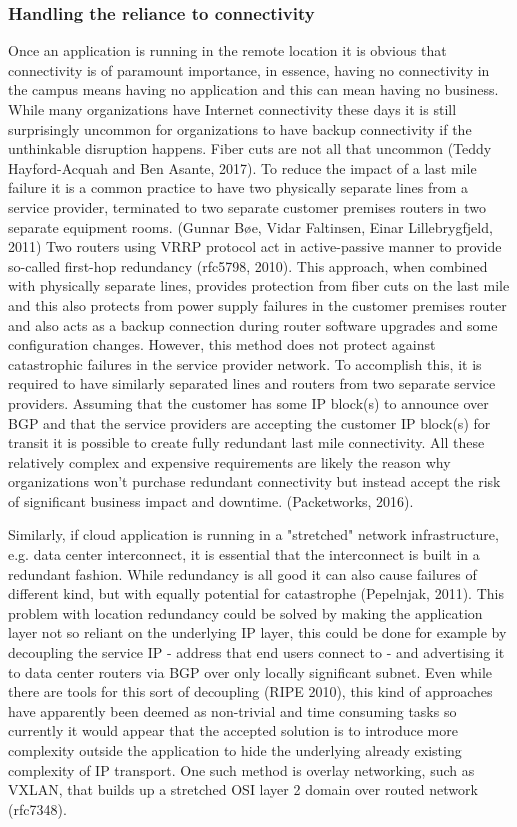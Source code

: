 \documentclass{article}
\begin{document}
\subsubsection{Handling the reliance to connectivity}
Once an application is running in the remote location it is obvious that connectivity is of paramount importance, in essence, having no connectivity in the campus means having no application and this can mean having no business. While many organizations have Internet connectivity these days it is still surprisingly uncommon for organizations to have backup connectivity if the unthinkable disruption happens. Fiber cuts are not all that uncommon (Teddy Hayford-Acquah and Ben Asante, 2017).
To reduce the impact of a last mile failure it is a common practice to have two physically separate lines from a service provider, terminated to two separate customer premises routers in two separate equipment rooms. (Gunnar Bøe, Vidar Faltinsen, Einar Lillebrygfjeld, 2011) Two routers using VRRP protocol act in active-passive manner to provide so-called first-hop redundancy (rfc5798, 2010). This approach, when combined with physically separate lines, provides protection from fiber cuts on the last mile and this also protects from power supply failures in the customer premises router and also acts as a backup connection during router software upgrades and some configuration changes.
However, this method does not protect against catastrophic failures in the service provider network. To accomplish this, it is required to have similarly separated lines and routers from two separate service providers. Assuming that the customer has some IP block(s) to announce over BGP and that the service providers are accepting the customer IP block(s) for transit it is possible to create fully redundant last mile connectivity. All these relatively complex and expensive requirements are likely the reason why organizations won't purchase redundant connectivity but instead accept the risk of significant business impact and downtime. (Packetworks, 2016).
\par
Similarly, if cloud application is running in a "stretched" network infrastructure, e.g. data center interconnect, it is essential that the interconnect is built in a redundant fashion. While redundancy is all good it can also cause failures of different kind, but with equally potential for catastrophe (Pepelnjak, 2011).
This problem with location redundancy could be solved by making the application layer not so reliant on the underlying IP layer, this could be done for example by decoupling the service IP - address that end users connect to - and advertising it to data center routers via BGP over only locally significant subnet. Even while there are tools for this sort of decoupling (RIPE 2010), this kind of approaches have apparently been deemed as non-trivial and time consuming tasks so currently it would appear that the accepted solution is to introduce more complexity outside the application to hide the underlying already existing complexity of IP transport. One such method is overlay networking, such as VXLAN, that builds up a stretched OSI layer 2 domain over routed network (rfc7348).
\end{document}
